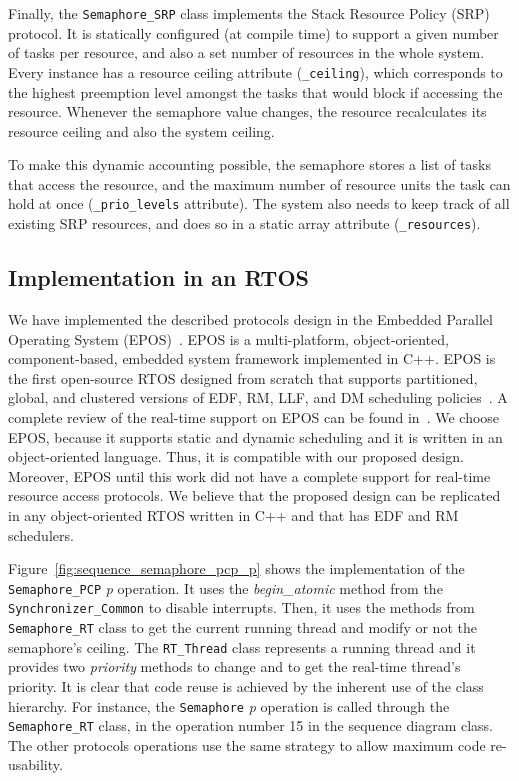 Finally, the \texttt{Semaphore\_SRP} class implements the Stack Resource Policy 
(SRP) protocol. It is statically configured (at compile time) to support a 
given number of tasks per resource, and also a set number of resources in the 
whole system. Every instance has a resource ceiling attribute 
(\texttt{\_ceiling}), which corresponds to the highest preemption level amongst 
the tasks that would block if accessing the resource. Whenever the semaphore 
value changes, the resource recalculates its resource ceiling and also the 
system ceiling. 

To make this dynamic accounting possible, the semaphore stores a list of tasks 
that access the resource, and the maximum number of resource units the task can 
hold at once (\texttt{\_prio\_levels} attribute). The system also needs to keep 
track of all existing SRP resources, and does so in a static array attribute 
(\texttt{\_resources}). 

\subsection{Implementation in an RTOS}

We have implemented the described protocols design in the Embedded Parallel 
Operating System (EPOS)~\cite{Froehlich:2001, epos}. EPOS is a
multi-platform, object-oriented, component-based, embedded system framework
implemented in C++. EPOS is the first open-source RTOS designed from scratch
that supports partitioned, global, and clustered versions of EDF, RM, LLF, and
DM scheduling policies~\cite{Gracioli:2013a}. A complete review of the real-time
support on EPOS can be found in~\cite{Gracioli:2013a}. We choose EPOS, because 
it supports static and dynamic scheduling and it is written in an 
object-oriented language. Thus, it is compatible with our proposed design. 
Moreover, EPOS until this work did not have a complete support for real-time 
resource access protocols. We believe that the proposed design can be replicated 
in any object-oriented RTOS written in C++ and that has EDF and RM schedulers.

Figure~\ref{fig:sequence_semaphore_pcp_p} shows the implementation of the 
\texttt{Semaphore\_PCP} \emph{p} operation. It uses the \emph{begin\_atomic} 
method from the \texttt{Synchronizer\_Common} to disable interrupts. Then, it 
uses the methods from \texttt{Semaphore\_RT} class to get the current running 
thread and modify or not the semaphore's ceiling. The \texttt{RT\_Thread} class 
represents a running thread and it provides two \emph{priority} methods to 
change and to get the real-time thread's priority. It is clear that code reuse 
is achieved by the inherent use of the class hierarchy. For instance, the 
\texttt{Semaphore} \emph{p} operation is called through the 
\texttt{Semaphore\_RT} class, in the operation number 15 in the sequence diagram 
class.  The other protocols operations use the same strategy to allow maximum 
code re-usability. 


